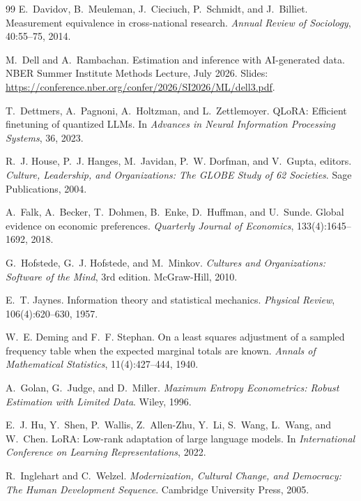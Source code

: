 \documentclass[10pt,letterpaper]{article}
\begin{document}
\begin{thebibliography}{99}
E.~Davidov, B.~Meuleman, J.~Cieciuch, P.~Schmidt, and J.~Billiet.
\newblock Measurement equivalence in cross-national research.
\newblock \emph{Annual Review of Sociology}, 40:55--75, 2014.

M.~Dell and A.~Rambachan.
\newblock Estimation and inference with AI-generated data.
\newblock NBER Summer Institute Methods Lecture, July 2026.
\newblock Slides: \url{https://conference.nber.org/confer/2026/SI2026/ML/dell3.pdf}.

T.~Dettmers, A.~Pagnoni, A.~Holtzman, and L.~Zettlemoyer.
\newblock QLoRA: Efficient finetuning of quantized LLMs.
\newblock In \emph{Advances in Neural Information Processing Systems}, 36, 2023.

R.~J. House, P.~J. Hanges, M.~Javidan, P.~W. Dorfman, and V.~Gupta, editors.
\newblock \emph{Culture, Leadership, and Organizations: The GLOBE Study of 62 Societies}.
\newblock Sage Publications, 2004.

A.~Falk, A.~Becker, T.~Dohmen, B.~Enke, D.~Huffman, and U.~Sunde.
\newblock Global evidence on economic preferences.
\newblock \emph{Quarterly Journal of Economics}, 133(4):1645--1692, 2018.

G.~Hofstede, G.~J. Hofstede, and M.~Minkov.
\newblock \emph{Cultures and Organizations: Software of the Mind}, 3rd edition.
\newblock McGraw-Hill, 2010.

E.~T. Jaynes.
\newblock Information theory and statistical mechanics.
\newblock \emph{Physical Review}, 106(4):620--630, 1957.

W.~E. Deming and F.~F. Stephan.
\newblock On a least squares adjustment of a sampled frequency table when the expected marginal totals are known.
\newblock \emph{Annals of Mathematical Statistics}, 11(4):427--444, 1940.

A.~Golan, G.~Judge, and D.~Miller.
\newblock \emph{Maximum Entropy Econometrics: Robust Estimation with Limited Data}.
\newblock Wiley, 1996.

E.~J. Hu, Y.~Shen, P.~Wallis, Z.~Allen-Zhu, Y.~Li, S.~Wang, L.~Wang, and W.~Chen.
\newblock LoRA: Low-rank adaptation of large language models.
\newblock In \emph{International Conference on Learning Representations}, 2022.

R.~Inglehart and C.~Welzel.
\newblock \emph{Modernization, Cultural Change, and Democracy: The Human Development Sequence}.
\newblock Cambridge University Press, 2005.


\end{thebibliography}
\end{document}
